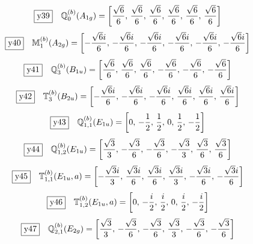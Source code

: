 \documentclass[fleqn,10pt,landscape]{jsarticle}
\begin{document}
\begin{dmath*}
\fbox{y39}\quad \mathbb{Q}_{0}^{(b)}(A_{1g})=\left[ \frac{\sqrt{6}}{6},\, \frac{\sqrt{6}}{6},\, \frac{\sqrt{6}}{6},\, \frac{\sqrt{6}}{6},\, \frac{\sqrt{6}}{6},\, \frac{\sqrt{6}}{6} \right]
\end{dmath*}
\begin{dmath*}
\fbox{y40}\quad \mathbb{M}_{1}^{(b)}(A_{2g})=\left[ - \frac{\sqrt{6} i}{6},\, - \frac{\sqrt{6} i}{6},\, - \frac{\sqrt{6} i}{6},\, - \frac{\sqrt{6} i}{6},\, - \frac{\sqrt{6} i}{6},\, - \frac{\sqrt{6} i}{6} \right]
\end{dmath*}
\begin{dmath*}
\fbox{y41}\quad \mathbb{Q}_{3}^{(b)}(B_{1u})=\left[ \frac{\sqrt{6}}{6},\, \frac{\sqrt{6}}{6},\, \frac{\sqrt{6}}{6},\, - \frac{\sqrt{6}}{6},\, - \frac{\sqrt{6}}{6},\, - \frac{\sqrt{6}}{6} \right]
\end{dmath*}
\begin{dmath*}
\fbox{y42}\quad \mathbb{T}_{3}^{(b)}(B_{2u})=\left[ - \frac{\sqrt{6} i}{6},\, - \frac{\sqrt{6} i}{6},\, - \frac{\sqrt{6} i}{6},\, \frac{\sqrt{6} i}{6},\, \frac{\sqrt{6} i}{6},\, \frac{\sqrt{6} i}{6} \right]
\end{dmath*}
\begin{dmath*}
\fbox{y43}\quad \mathbb{Q}_{1,1}^{(b)}(E_{1u})=\left[ 0,\, - \frac{1}{2},\, \frac{1}{2},\, 0,\, \frac{1}{2},\, - \frac{1}{2} \right]
\end{dmath*}
\begin{dmath*}
\fbox{y44}\quad \mathbb{Q}_{1,2}^{(b)}(E_{1u})=\left[ \frac{\sqrt{3}}{3},\, - \frac{\sqrt{3}}{6},\, - \frac{\sqrt{3}}{6},\, - \frac{\sqrt{3}}{3},\, \frac{\sqrt{3}}{6},\, \frac{\sqrt{3}}{6} \right]
\end{dmath*}
\begin{dmath*}
\fbox{y45}\quad \mathbb{T}_{1,1}^{(b)}(E_{1u},a)=\left[ - \frac{\sqrt{3} i}{3},\, \frac{\sqrt{3} i}{6},\, \frac{\sqrt{3} i}{6},\, \frac{\sqrt{3} i}{3},\, - \frac{\sqrt{3} i}{6},\, - \frac{\sqrt{3} i}{6} \right]
\end{dmath*}
\begin{dmath*}
\fbox{y46}\quad \mathbb{T}_{1,2}^{(b)}(E_{1u},a)=\left[ 0,\, - \frac{i}{2},\, \frac{i}{2},\, 0,\, \frac{i}{2},\, - \frac{i}{2} \right]
\end{dmath*}
\begin{dmath*}
\fbox{y47}\quad \mathbb{Q}_{2,1}^{(b)}(E_{2g})=\left[ \frac{\sqrt{3}}{3},\, - \frac{\sqrt{3}}{6},\, - \frac{\sqrt{3}}{6},\, \frac{\sqrt{3}}{3},\, - \frac{\sqrt{3}}{6},\, - \frac{\sqrt{3}}{6} \right]
\end{dmath*}
\end{document}
